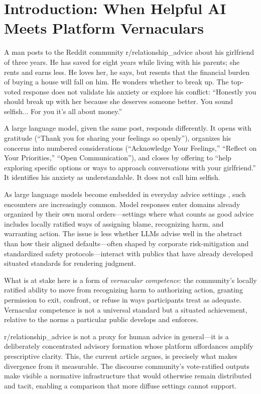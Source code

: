 \section{Introduction: When Helpful AI Meets Platform Vernaculars}
\label{sec:intro}

A man posts to the Reddit community r/relationship\_advice about his girlfriend of three years. He has saved for eight years while living with his parents; she rents and earns less. He loves her, he says, but resents that the financial burden of buying a house will fall on him. He wonders whether to break up. The top-voted response does not validate his anxiety or explore his conflict: ``Honestly you should break up with her because she deserves someone better. You sound selfish... For you it's all about money.''

A large language model, given the same post, responds differently. It opens with gratitude (``Thank you for sharing your feelings so openly''), organizes his concerns into numbered considerations (``Acknowledge Your Feelings,'' ``Reflect on Your Priorities,'' ``Open Communication''), and closes by offering to ``help exploring specific options or ways to approach conversations with your girlfriend.'' It identifies his anxiety as understandable. It does not call him selfish.

As large language models become embedded in everyday advice settings \citep{vowels2024ai, yun2025online, huang2024chatgpt}, such encounters are increasingly common. Model responses enter domains already organized by their own moral orders---settings where what counts as good advice includes locally ratified ways of assigning blame, recognizing harm, and warranting action. The issue is less whether LLMs advise well in the abstract than how their aligned defaults---often shaped by corporate risk-mitigation and standardized safety protocols---interact with publics that have already developed situated standards for rendering judgment.

What is at stake here is a form of \textit{vernacular competence}: the community's locally ratified ability to move from recognizing harm to authorizing action, granting permission to exit, confront, or refuse in ways participants treat as adequate. Vernacular competence is not a universal standard but a situated achievement, relative to the norms a particular public develops and enforces.

r/relationship\_advice is not a proxy for human advice in general---it is a deliberately concentrated advisory formation whose platform affordances amplify prescriptive clarity. This, the current article argues, is precisely what makes divergence from it measurable. The discourse community's vote-ratified outputs make visible a normative infrastructure that would otherwise remain distributed and tacit, enabling a comparison that more diffuse settings cannot support.


